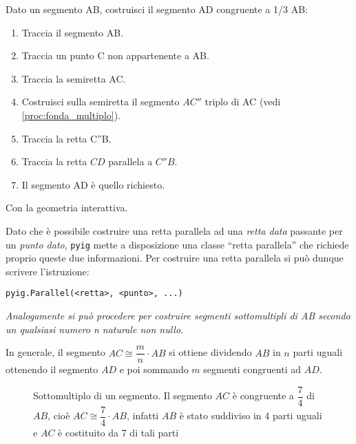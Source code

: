 \begin{procedura}\label{proc:fonda_sottomultiplo}
  Dato un segmento AB, costruisci il segmento AD congruente a 1/3 AB:
  \begin{enumerate} [nosep]
    \item 
    Traccia il segmento AB.    
    \item 
    Traccia un punto C non appartenente a AB.   
    \item 
    Traccia la semiretta AC.    
    \item 
    Costruisci sulla semiretta il segmento \(AC''\) triplo di AC
    (vedi \ref{proc:fonda_multiplo}).
    \item 
    Traccia la retta C''B. 
    \item 
    Traccia la retta \(CD\) parallela a \(C''B\).      
    \item 
    Il segmento AD è quello richiesto.    
  \end{enumerate}
\end{procedura}

Con la geometria interattiva.

\begin{osservazione}
Dato che è possibile costruire una retta parallela ad una \emph{retta data} 
passante per un \emph{punto dato}, \lstinline{pyig} mette a disposizione una 
classe ``retta parallela'' che richiede proprio queste due informazioni.
Per costruire una retta parallela si può dunque scrivere l'istruzione:

\lstinline{pyig.Parallel(<retta>, <punto>, ...)}
\end{osservazione}



\textit{Analogamente si può procedere per costruire segmenti sottomultipli di 
AB secondo un qualsiasi numero n naturale non nullo.}

In generale, il segmento $AC\cong\dfrac{m}{n}\cdot AB$ si ottiene 
dividendo $AB$ in $n$ parti uguali ottenendo il segmento $AD$ e poi 
sommando $m$ segmenti congruenti ad $AD$.

\begin{inaccessibleblock}
 \begin{figure}[htb]
\centering
\caption{Sottomultiplo di un segmento. Il segmento $AC$ è congruente 
a $\dfrac{7}{4}$ di $AB$, cioè $AC\cong\dfrac{7}{4}\cdot AB$, infatti 
$AB$ è stato suddiviso in 4 parti uguali e $AC$ è costituito da 7 di 
tali parti}
\end{figure}
\end{inaccessibleblock}

